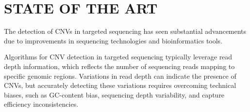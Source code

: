 \documentclass[a4paper,12pt,twoside]{ThesisStyle}
\begin{document}
\section{STATE OF THE ART}

The detection of CNVs in targeted sequencing has seen substantial advancements due to improvements in sequencing technologies and bioinformatics tools. 

Algorithms for CNV detection in targeted sequencing typically leverage read depth information, which reflects the number of sequencing reads mapping to specific genomic regions. Variations in read depth can indicate the presence of CNVs, but accurately detecting these variations requires overcoming technical biases, such as GC-content bias, sequencing depth variability, and capture efficiency inconsistencies.
\end{document}
